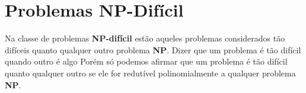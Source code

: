 \section{Problemas NP-Difícil}
Na classe de problemas \textbf{NP-difícil} estão aqueles problemas considerados tão difíceis quanto qualquer outro problema \textbf{NP}. Dizer que um problema é tão difícil quando outro é algo 
Porém só podemos afirmar que um problema é tão difícil quanto qualquer outro se ele for redutível polinomialmente a qualquer problema \textbf{NP}.
